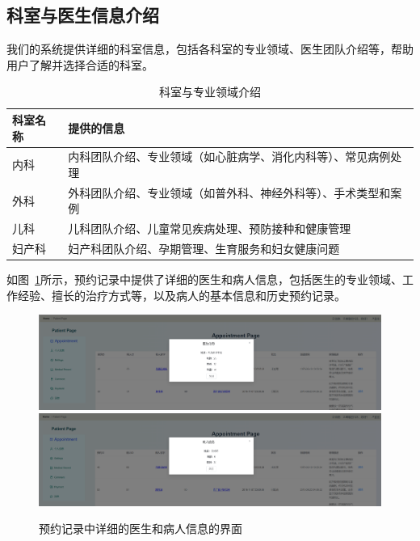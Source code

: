 \subsection{科室与医生信息介绍}
我们的系统提供详细的科室信息，包括各科室的专业领域、医生团队介绍等，帮助用户了解并选择合适的科室。
\begin{table}[htbp]
	\centering
	\begin{tabular}{|p{6cm}|p{6cm}|}
		\hline
		\textbf{科室名称} & \textbf{提供的信息} \\
		\hline
		内科 & 内科团队介绍、专业领域（如心脏病学、消化内科等）、常见病例处理 \\
		外科 & 外科团队介绍、专业领域（如普外科、神经外科等）、手术类型和案例 \\
		儿科 & 儿科团队介绍、儿童常见疾病处理、预防接种和健康管理 \\
		妇产科 & 妇产科团队介绍、孕期管理、生育服务和妇女健康问题 \\
		\hline
	\end{tabular}
	\caption{科室与专业领域介绍}
\end{table}
如图~\ref{a89}所示，预约记录中提供了详细的医生和病人信息，包括医生的专业领域、工作经验、擅长的治疗方式等，以及病人的基本信息和历史预约记录。
\begin{figure}[!h]
	\centering
	\includegraphics[width=\textwidth]{figures/a9.png}
	\includegraphics[width=\textwidth]{figures/a10.png}
	\caption{预约记录中详细的医生和病人信息的界面}
	\label{a89}
\end{figure}

